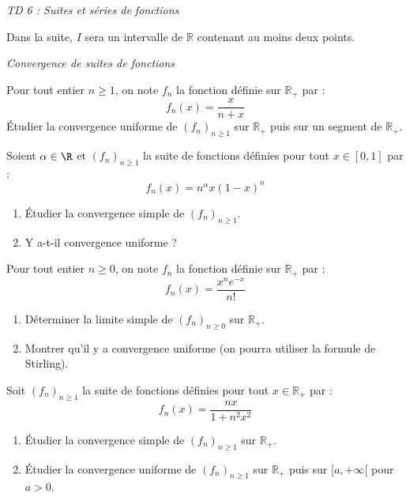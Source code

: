 \documentclass[a4paper,10pt]{report}
\begin{document}
\everymath{\displaystyle}


\begin{center}
\textit{{ {\huge TD 6 : Suites et séries de fonctions}}}
\end{center}


\bigskip

\noindent Dans la suite, $I$ sera un intervalle de $\mathbb{R}$ contenant au moins deux points.

\medskip

\begin{center}
\textit{{ {\large Convergence de suites de fonctions}}}
\end{center}


\begin{Exa} Pour tout entier $n \geq 1$, on note $f_n$ la fonction définie sur $\mathbb{R}_+$ par :
$$ f_n(x) = \frac{x}{n+x}$$
Étudier la convergence uniforme de $(f_n)_{n \geq 1}$ sur $\mathbb{R}_+$ puis sur un segment de $\mathbb{R}_+$.
\end{Exa}


\begin{Exa} Soient $\alpha \in \R$ et $(f_n)_{n \geq 1}$ la suite de fonctions définies pour tout $x \in [0,1]$ par :
$$f_n(x) = n^\alpha x(1-x)^n$$

\begin{enumerate}
 \item Étudier la convergence simple de $(f_n)_{n \geq 1}$.
 \item Y a-t-il convergence uniforme ?
  \end{enumerate}
\end{Exa}


\begin{Exa} Pour tout entier $n \geq 0$, on note $f_n$ la fonction définie sur $\mathbb{R}_+$ par :
$$ f_n(x) = \frac{x^n e^{-x}}{n!}$$

\begin{enumerate}
\item Déterminer la limite simple de $(f_n)_{n \geq 0}$ sur $\mathbb{R}_+$.
\item Montrer qu'il y a convergence uniforme (on pourra utiliser la formule de Stirling).
\end{enumerate}
\end{Exa} 


\begin{Exa} Soit $(f_n)_{n \geq 1}$ la suite de fonctions définies pour tout $x \in \mathbb{R}_+$ par :
$$f_n(x) = \frac {nx}{1+n^2x^2}$$
\begin{enumerate}
\item Étudier la convergence simple de $(f_n)_{n \geq 1}$ sur $\mathbb{R}_+$.
\item Étudier la convergence uniforme de $(f_n)_{n \geq 1}$ sur $\mathbb{R}_+$ puis sur $[a, + \infty[$ pour $a>0$.
\end{enumerate}
\end{Exa}
\end{document}
